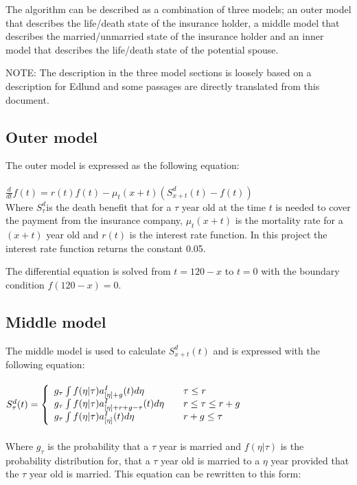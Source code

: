 The algorithm can be described as a combination of three models; an outer model that describes the life/death state of the insurance holder, a middle model that describes the married/unmarried state of the insurance holder and an inner model that describes the life/death state of the potential spouse.

NOTE: The description in the three model sections is loosely based on a description for Edlund\cite{edlu} and some passages are directly translated from this document.

\subsection{Outer model}
The outer model is expressed as the following equation:
\\ \\$\frac{d}{dt} f(t) = r(t) f(t) - \mu_t(x+t) (S_{x+t}^d (t) - f(t))$ \\

Where $S_\tau^d$is the death benefit that for a $\tau$ year old at the time $t$ is needed to cover the payment from the insurance company, $\mu_t(x+t)$ is the mortality rate for a $(x + t)$ year old and $r(t)$ is the interest rate function. In this project the interest rate function returns the constant 0.05.

The differential equation is solved from $t=120-x$ to $t=0$ with the boundary condition $f(120-x)=0$.

\subsection{Middle model}
The middle model is used to calculate $S_{x+t}^d (t)$ and is expressed with the following equation: \\ \\
$S_\tau^d(t) = \left\{ 
  \begin{array}{l l}
    	g_\tau \int	f(\eta|\tau)a_{[\eta] + g}^I(t)d\eta									& \quad \text{$\tau \le r$}\\
    	g_\tau \int	f(\eta|\tau)a_{[\eta] + r + g - \tau}^I(t)d\eta 			& \quad \text{$r \leq \tau \le r + g$}\\
			g_\tau \int	f(\eta|\tau)a_{[\eta]}^I(t)d\eta 											& \quad \text{$r +g \leq \tau$}
  \end{array} \right.$ \\ \\

Where $g_\tau$ is the probability that a $\tau$ year is married and $f(\eta|\tau)$ is the probability distribution for, that a $\tau$ year old is married to a $\eta$ year provided that the $\tau$ year old is married.
This equation can be rewritten to this form: \\

